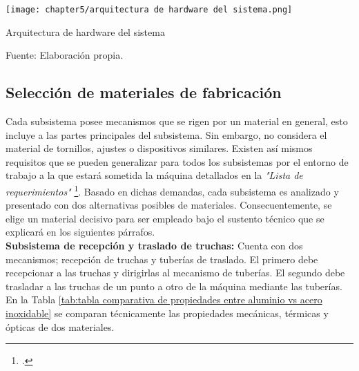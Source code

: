 \begin{myfigure}[H]
	\footnotesize\centering
	\texttt{[image: chapter5/arquitectura de hardware del sistema.png]}
	\caption{Arquitectura de hardware del sistema}
	\begin{myflushcenter}
		Fuente: Elaboración propia.
	\end{myflushcenter}
	\label{fig:arquitectura de hardware del sistema}
\end{myfigure}

\subsection{Selección de materiales de fabricación}
\label{sssec:seleccion de materiales de fabricacion}

Cada subsistema posee mecanismos que se rigen por un material en general, esto incluye a las partes principales del subsistema. Sin embargo, no considera el material de tornillos, ajustes o dispositivos similares. Existen así mismos requisitos que se pueden generalizar para todos los subsistemas por el entorno de trabajo a la que estará sometida la máquina detallados en la \textit{"Lista de requerimientos"} \footnote{\cite{DiazVergara2020}.}. Basado en dichas demandas, cada subsistema es analizado y presentado con dos alternativas posibles de materiales. Consecuentemente, se elige un material decisivo para ser empleado bajo el sustento técnico que se explicará en los siguientes párrafos.\\


\textbf{Subsistema de recepción y traslado de truchas:} Cuenta con dos mecanismos; recepción de truchas y tuberías de traslado. El primero debe recepcionar a las truchas y dirigirlas al mecanismo de tuberías. El segundo debe trasladar a las truchas de un punto a otro de la máquina mediante las tuberías. En la Tabla \ref{tab:tabla comparativa de propiedades entre aluminio vs acero inoxidable} se comparan técnicamente las propiedades mecánicas, térmicas y ópticas de dos materiales.

